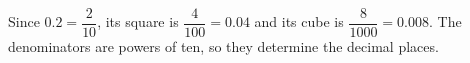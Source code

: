 Since $0.2=\dfrac{2}{10}$, its square is $\dfrac{4}{100}=\boxed{0.04}$ and its cube is $\dfrac{8}{1000}=\boxed{0.008}$. The denominators are powers of ten, so they determine the decimal places.
